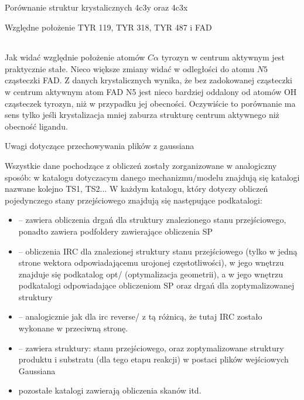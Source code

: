 \documentclass[10pt,a4paper]{article}
\begin{document}
\begin{section} {Porównanie struktur krystalicznych 4c3y oraz 4c3x}
\begin{subsection} {Względne położenie TYR 119, TYR 318, TYR 487 i FAD}
\begin{tabular}{||c c c c c||}
\end{tabular}
 
 Jak widać względnie położenie atomów $C\alpha$ tyrozyn w centrum aktywnym jest praktycznie stałe. Nieco większe zmiany widać w odległości do atomu $N5$ cząsteczki FAD. 
 Z danych krystalicznych wynika, że bez zadokowanej cząsteczki w centrum aktywnym atom FAD N5 jest nieco bardziej oddalony od atomów OH cząsteczek tyrozyn, niż w przypadku jej obecności.
 Oczywiście to porównanie ma sens tylko jeśli krystalizacja mniej zaburza strukturę centrum aktywnego niż obecność ligandu.
 
 \end{subsection}

 
 
\end{section}




\begin{section}{Uwagi dotyczące przechowywania plików z gaussiana}

Wszystkie dane pochodzące z obliczeń zostały zorganizowane w analogiczny sposób: w katalogu dotyczacym danego mechanizmu/modelu znajdują się katalogi nazwane kolejno TS1, TS2...
W każdym katalogu, który dotyczy obliczeń pojedynczego stany przejściowego znajdują się następujące podkatalogi:
\begin{itemize}
 \item {} -- zawiera obliczenia drgań dla struktury znalezionego stanu przejściowego, ponadto zawiera podfoldery zawierające obliczenia SP
 \item {} -- obliczenia IRC dla znalezionej struktury stanu przejściowego (tylko w jedną strone wektora odpowiadającemu urojonej częstotliwości), w jego wnętrzu znajduje
 się podkatalog opt/ (optymalizacja geometrii), a w jego wnętrzu podkatalogi odpowiadające obliczeniom SP oraz drgań dla zoptymalizowanej struktury
 \item {} -- analogicznie jak dla irc reverse/ z tą różnicą, że tutaj IRC zostało wykonane w przeciwną stronę.
 \item {} -- zawiera struktury: stanu przejściowego, oraz zoptymalizowane struktury produktu i substratu (dla tego etapu reakcji) w postaci plików wejściowych Gaussiana
 \item pozostałe katalogi zawierają obliczenia skanów itd.
\end{itemize}

 
\end{section}
\end{document}
